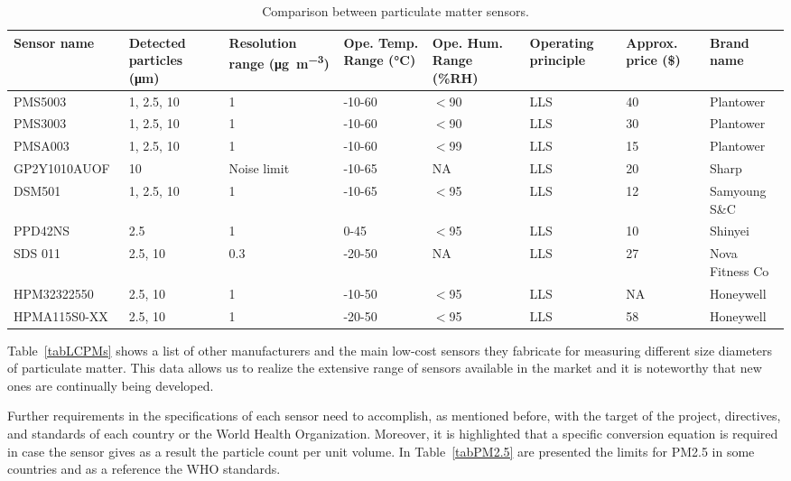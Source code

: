 \documentclass[10pt]{../imeko_acta}
\begin{document}
\begin{table}[!t]
	\caption{Comparison between particulate matter sensors.}
        \label{tabPMsensor}
	\centering
    \begin{tabular}{p{3cm}p{1.5cm}p{1.5cm}p{1.5cm}p{1.5cm}p{1.5cm}p{1.5cm}p{2.5cm}}
        \toprule
	Sensor name	& Detected particles (\unit{\um})& Resolution range (\unit{\ug\per\meter\tothe{3}}) &       Ope. Temp. Range (\unit{\degreeCelsius}) & Ope. Hum. Range (\%RH)& Operating principle&          Approx. price (\$) & Brand name\\
	\midrule
	PMS5003~\cite{PMS5003}\therownum & 1, 2.5, 10 & 1 & -10-60 & $<$90 & LLS     & 40 & Plantower\\
	PMS3003~\cite{PMS3003}\therownum& 1, 2.5, 10 & 1 & -10-60  & $<$90 & LLS  & 30 & Plantower \\
	PMSA003~\cite{PMSA0003} & 1, 2.5, 10 & 1 & -10-60 & $<$99 & LLS & 15 & Plantower \\
	GP2Y1010AUOF~\cite{GP2Y1010AU0F} & 10 & Noise limit & -10-65 & NA & LLS & 20 & Sharp \\
	DSM501~\cite{DSM501} & 1,  2.5, 10& 1 & -10-65 & $<$95 & LLS & 12 & Samyoung S\&C\\
	PPD42NS~\cite{PPD42NS} & 2.5 & 1  & 0-45 & $<$95 & LLS & 10 & Shinyei \\
	SDS 011~\cite{SDS011} &2.5, 10  &  0.3 & -20-50 & NA  & LLS & 27 & Nova Fitness Co\\
	HPM32322550~\cite{HPM32322550} & 2.5, 10 & 1 & -10-50 & $<$95 & LLS & NA & Honeywell\\
	HPMA115S0-XX~\cite{HPM32322550} & 2.5, 10 & 1 & -20-50 & $<$95 & LLS & 58 & Honeywell\\
	\bottomrule
	\end{tabular}
\end{table}

Table~\ref{tabLCPMs} shows a list of other manufacturers and the main low-cost sensors they fabricate for measuring different size diameters of particulate matter. This data allows us to realize the extensive range of sensors available in the market and it is noteworthy that new ones are continually being developed. 



Further requirements in the specifications of each sensor need to accomplish, as mentioned before, with the target of the project, directives, and standards of each country or the World Health Organization. Moreover, it is highlighted that a specific conversion equation is required in case the sensor gives as a result the particle count per unit volume.
 In Table~\ref{tabPM2.5} are presented the limits for PM2.5 in some countries and as a reference the WHO standards.
\end{document}
